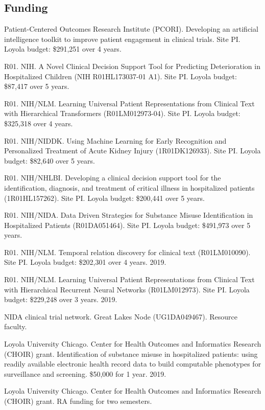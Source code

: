 \documentclass[letterpaper]{article}
\renewenvironment{itemize}{
  \begin{list}{}{
    \setlength{\leftmargin}{1.5em}
  }
}{
  \end{list}
}
\begin{document}
\subsection*{Funding}

\begin{itemize}
\item Patient-Centered Outcomes Research Institute (PCORI). Developing an artificial intelligence toolkit to improve patient engagement in clinical trials. Site PI. Loyola budget: \$291,251 over 4 years.
\item R01. NIH. A Novel Clinical Decision Support Tool for Predicting Deterioration in Hospitalized Children (NIH R01HL173037-01 A1). Site PI. Loyola budget: \$87,417 over 5 years.
\item R01. NIH/NLM. Learning Universal Patient Representations from Clinical Text with Hierarchical Transformers (R01LM012973-04). Site PI. Loyola budget: \$325,318 over 4 years.
\item R01. NIH/NIDDK. Using Machine Learning for Early Recognition and Personalized Treatment of Acute Kidney Injury (1R01DK126933). Site PI. Loyola budget: \$82,640 over 5 years.
\item R01. NIH/NHLBI. Developing a clinical decision support tool for the identification, diagnosis, and treatment of critical illness in hospitalized patients (1R01HL157262). Site PI. Loyola budget: \$200,441 over 5 years.
\item R01. NIH/NIDA. Data Driven Strategies for Substance Misuse Identification in Hospitalized Patients (R01DA051464). Site PI. Loyola budget: \$491,973 over 5 years.
\item R01. NIH/NLM. Temporal relation discovery for clinical text (R01LM010090). Site PI. Loyola budget: \$202,301 over 4 years. 2019.
\item R01. NIH/NLM. Learning Universal Patient Representations from Clinical Text with Hierarchical Recurrent Neural Networks (R01LM012973). Site PI. Loyola budget: \$229,248 over 3 years. 2019.
\item NIDA clinical trial network. Great Lakes Node (UG1DA049467). Resource faculty.
\item Loyola University Chicago. Center for Health Outcomes and Informatics Research (CHOIR) grant. Identification of substance misuse in hospitalized patients: using readily available electronic health record data to build computable phenotypes for surveillance and screening. \$50,000 for 1 year. 2019.
\item Loyola University Chicago. Center for Health Outcomes and Informatics Research (CHOIR) grant. RA funding for two semesters.

\end{itemize}
\end{document}
